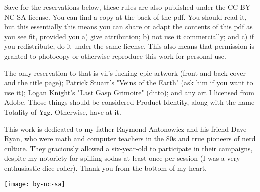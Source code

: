 {\begin{multicols*}{2}
Save for the reservations below, these rules are also published under the CC BY-NC-SA license. You can find a copy at the back of the pdf. You should read it, but this essentially this means you can share or adapt the contents of this pdf as you see fit, provided you a) give attribution; b) not use it commercially; and c) if you redistribute, do it under the same license. This also means that permission is granted to photocopy or otherwise reproduce this work for personal use. 

The only reservation to that is vil's fucking epic artwork (front and back cover and the title page); Patrick Stuart's "Veins of the Earth" (ask him if you want to use it);  Logan Knight's "Last Gasp Grimoire" (ditto); and any art I licensed from Adobe.  Those things should be considered Product Identity, along with the name Totality of Ygg. Otherwise, have at it.

This work is dedicated to my father Raymond Antonowicz and his friend Dave Ryan, who were math and computer teachers in the 80s and true pioneers of nerd culture. They graciously allowed a six-year-old to participate in their campaigns, despite my notoriety for spilling sodas at least once per session (I was a very enthusiastic dice roller). Thank you from the bottom of my heart. 


\begin{center}
\texttt{[image: by-nc-sa]}
\end{center}

\thispagestyle{empty}
\end{multicols*}
} %
